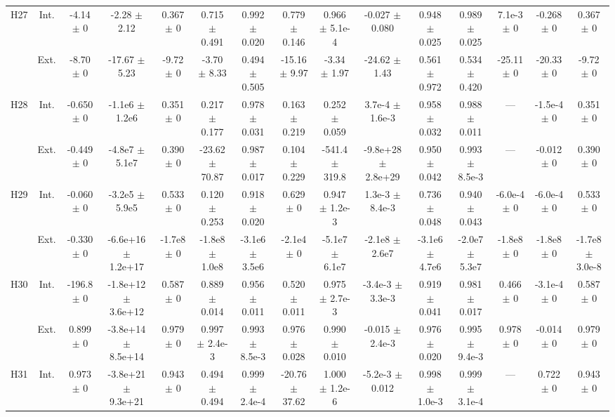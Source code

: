\begin{table}[htbp]
{\begin{tabular}{@{}ccccccccccccccc@{}}
\cline{2-15}
\multirow{2}{*}{H27} & Int. & -4.14 $\pm$ 0 & -2.28 $\pm$ 2.12 & 0.367 $\pm$ 0 & 0.715 $\pm$ 0.491 & 0.992 $\pm$ 0.020 & 0.779 $\pm$ 0.146 & 0.966 $\pm$ 5.1e-4 & -0.027 $\pm$ 0.080 & 0.948 $\pm$ 0.025 & 0.989 $\pm$ 0.025 & 7.1e-3 $\pm$ 0 & -0.268 $\pm$ 0 & 0.367 $\pm$ 0 \\
 & Ext. & -8.70 $\pm$ 0 & -17.67 $\pm$ 5.23 & -9.72 $\pm$ 0 & -3.70 $\pm$ 8.33 & 0.494 $\pm$ 0.505 & -15.16 $\pm$ 9.97 & -3.34 $\pm$ 1.97 & -24.62 $\pm$ 1.43 & 0.561 $\pm$ 0.972 & 0.534 $\pm$ 0.420 & -25.11 $\pm$ 0 & -20.33 $\pm$ 0 & -9.72 $\pm$ 0 \\
\cline{2-15}
\multirow{2}{*}{H28} & Int. & -0.650 $\pm$ 0 & -1.1e6 $\pm$ 1.2e6 & 0.351 $\pm$ 0 & 0.217 $\pm$ 0.177 & 0.978 $\pm$ 0.031 & 0.163 $\pm$ 0.219 & 0.252 $\pm$ 0.059 & 3.7e-4 $\pm$ 1.6e-3 & 0.958 $\pm$ 0.032 & 0.988 $\pm$ 0.011 & --- & -1.5e-4 $\pm$ 0 & 0.351 $\pm$ 0 \\
 & Ext. & -0.449 $\pm$ 0 & -4.8e7 $\pm$ 5.1e7 & 0.390 $\pm$ 0 & -23.62 $\pm$ 70.87 & 0.987 $\pm$ 0.017 & 0.104 $\pm$ 0.229 & -541.4 $\pm$ 319.8 & -9.8e+28 $\pm$ 2.8e+29 & 0.950 $\pm$ 0.042 & 0.993 $\pm$ 8.5e-3 & --- & -0.012 $\pm$ 0 & 0.390 $\pm$ 0 \\
\cline{2-15}
\multirow{2}{*}{H29} & Int. & -0.060 $\pm$ 0 & -3.2e5 $\pm$ 5.9e5 & 0.533 $\pm$ 0 & 0.120 $\pm$ 0.253 & 0.918 $\pm$ 0.020 & 0.629 $\pm$ 0 & 0.947 $\pm$ 1.2e-3 & 1.3e-3 $\pm$ 8.4e-3 & 0.736 $\pm$ 0.048 & 0.940 $\pm$ 0.043 & -6.0e-4 $\pm$ 0 & -6.0e-4 $\pm$ 0 & 0.533 $\pm$ 0 \\
 & Ext. & -0.330 $\pm$ 0 & -6.6e+16 $\pm$ 1.2e+17 & -1.7e8 $\pm$ 0 & -1.8e8 $\pm$ 1.0e8 & -3.1e6 $\pm$ 3.5e6 & -2.1e4 $\pm$ 0 & -5.1e7 $\pm$ 6.1e7 & -2.1e8 $\pm$ 2.6e7 & -3.1e6 $\pm$ 4.7e6 & -2.0e7 $\pm$ 5.3e7 & -1.8e8 $\pm$ 0 & -1.8e8 $\pm$ 0 & -1.7e8 $\pm$ 3.0e-8 \\
\cline{2-15}
\multirow{2}{*}{H30} & Int. & -196.8 $\pm$ 0 & -1.8e+12 $\pm$ 3.6e+12 & 0.587 $\pm$ 0 & 0.889 $\pm$ 0.014 & 0.956 $\pm$ 0.011 & 0.520 $\pm$ 0.011 & 0.975 $\pm$ 2.7e-3 & -3.4e-3 $\pm$ 3.3e-3 & 0.919 $\pm$ 0.041 & 0.981 $\pm$ 0.017 & 0.466 $\pm$ 0 & -3.1e-4 $\pm$ 0 & 0.587 $\pm$ 0 \\
 & Ext. & 0.899 $\pm$ 0 & -3.8e+14 $\pm$ 8.5e+14 & 0.979 $\pm$ 0 & 0.997 $\pm$ 2.4e-3 & 0.993 $\pm$ 8.5e-3 & 0.976 $\pm$ 0.028 & 0.990 $\pm$ 0.010 & -0.015 $\pm$ 2.4e-3 & 0.976 $\pm$ 0.020 & 0.995 $\pm$ 9.4e-3 & 0.978 $\pm$ 0 & -0.014 $\pm$ 0 & 0.979 $\pm$ 0 \\
\cline{2-15}
\multirow{2}{*}{H31} & Int. & 0.973 $\pm$ 0 & -3.8e+21 $\pm$ 9.3e+21 & 0.943 $\pm$ 0 & 0.494 $\pm$ 0.494 & 0.999 $\pm$ 2.4e-4 & -20.76 $\pm$ 37.62 & 1.000 $\pm$ 1.2e-6 & -5.2e-3 $\pm$ 0.012 & 0.998 $\pm$ 1.0e-3 & 0.999 $\pm$ 3.1e-4 & --- & 0.722 $\pm$ 0 & 0.943 $\pm$ 0 \\

\end{tabular}}
\end{table}
